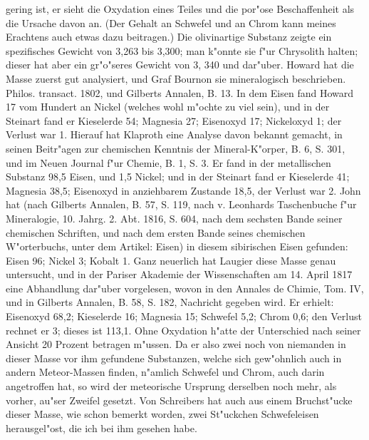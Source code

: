 \documentclass[a4paper, 11pt, oneside, polutonikogreek, german]{article}
\begin{document}
gering ist, er sieht die Oxydation eines Teiles und die por"ose Beschaffenheit als die Ursache davon an. (Der Gehalt an Schwefel und an Chrom kann meines Erachtens auch etwas dazu beitragen.) Die olivinartige Substanz zeigte ein spezifisches Gewicht von 3,263 bis 3,300; man k"onnte sie f"ur Chrysolith halten; dieser hat aber ein gr"o"seres Gewicht von 3, 340 und dar"uber. Howard hat die Masse zuerst gut analysiert, und Graf Bournon sie mineralogisch beschrieben. Philos. transact. 1802, und Gilberts Annalen, B. 13. In dem Eisen fand Howard 17 vom Hundert an Nickel (welches wohl m"ochte zu viel sein), und in der Steinart fand er Kieselerde 54; Magnesia 27; Eisenoxyd 17; Nickeloxyd 1; der Verlust war 1. Hierauf hat Klaproth eine Analyse davon bekannt gemacht, in seinen Beitr"agen zur chemischen Kenntnis der Mineral-K"orper, B. 6, S. 301, und im Neuen Journal f"ur Chemie, B. 1, S. 3. Er fand in der metallischen Substanz 98,5 Eisen, und 1,5 Nickel; und in der Steinart fand er Kieselerde 41; Magnesia 38,5; Eisenoxyd in anziehbarem Zustande 18,5, der Verlust war 2. John hat (nach Gilberts Annalen, B. 57, S. 119, nach v. Leonhards Taschenbuche f"ur Mineralogie, 10. Jahrg. 2. Abt. 1816, S. 604, nach dem sechsten Bande seiner chemischen Schriften, und nach dem ersten Bande seines chemischen W"orterbuchs, unter dem Artikel: Eisen) in diesem sibirischen Eisen gefunden: Eisen 96; Nickel 3; Kobalt 1. Ganz neuerlich hat Laugier diese Masse genau untersucht, und in der Pariser Akademie der Wissenschaften am 14. April 1817 eine Abhandlung dar"uber vorgelesen, wovon in den Annales de Chimie, Tom. IV, und in Gilberts Annalen, B. 58, S. 182, Nachricht gegeben wird. Er erhielt: Eisenoxyd 68,2; Kieselerde 16; Magnesia 15; Schwefel 5,2; Chrom 0,6; den Verlust rechnet er 3; dieses ist 113,1. Ohne Oxydation h"atte der Unterschied nach seiner Ansicht 20 Prozent betragen m"ussen. Da er also zwei noch von niemanden in dieser Masse vor ihm gefundene Substanzen, welche sich gew"ohnlich auch in andern Meteor-Massen finden, n"amlich Schwefel und Chrom, auch darin angetroffen hat, so wird der meteorische Ursprung derselben noch mehr, als vorher, au"ser Zweifel gesetzt. Von Schreibers hat auch aus einem Bruchst"ucke dieser Masse, wie schon bemerkt worden, zwei St"uckchen Schwefeleisen herausgel"ost, die ich bei ihm gesehen habe.
\end{document}
